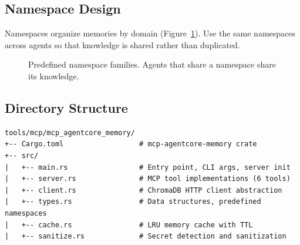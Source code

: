\documentclass[11pt,letterpaper]{article}
\begin{document}
\subsection{Namespace Design}

Namespaces organize memories by domain (Figure~\ref{fig:namespaces}). Use the same namespaces across agents so that knowledge is shared rather than duplicated.

\begin{figure}[!htbp]
\centering
{}
\caption{Predefined namespace families. Agents that share a namespace share its knowledge.}\label{fig:namespaces}
\end{figure}

\subsection{Directory Structure}

\begin{lstlisting}[caption={MCP server package layout (Rust)}, language={}]
tools/mcp/mcp_agentcore_memory/
+-- Cargo.toml                  # mcp-agentcore-memory crate
+-- src/
|   +-- main.rs                 # Entry point, CLI args, server init
|   +-- server.rs               # MCP tool implementations (6 tools)
|   +-- client.rs               # ChromaDB HTTP client abstraction
|   +-- types.rs                # Data structures, predefined namespaces
|   +-- cache.rs                # LRU memory cache with TTL
|   +-- sanitize.rs             # Secret detection and sanitization
\end{lstlisting}
\end{document}
